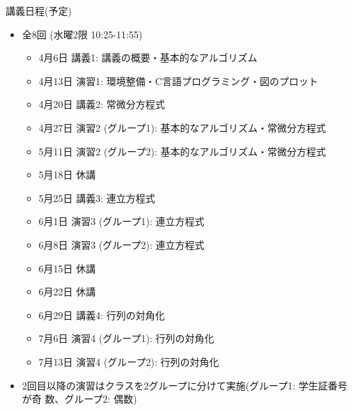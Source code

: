 \documentclass[10pt,dvipdfmx]{beamer}
\begin{document}
\begin{frame}[t]{講義日程(予定)}
  \begin{itemize}
  \item 全8回 (水曜2限 10:25-11:55)
    \begin{itemize}
    \item 4月6日 講義1: 講義の概要・基本的なアルゴリズム
    \item 4月13日 演習1: 環境整備・C言語プログラミング・図のプロット
    \item 4月20日 講義2: 常微分方程式
    \item {\color{red} 4月27日 演習2 (グループ1):} 基本的なアルゴリズム・常微分方程式
    \item {\color{red} 5月11日 演習2 (グループ2):} 基本的なアルゴリズム・常微分方程式
    \item {\color{gray} 5月18日 休講}
    \item 5月25日 講義3: 連立方程式
    \item 6月1日 演習3 (グループ1): 連立方程式
    \item 6月8日 演習3 (グループ2): 連立方程式
    \item {\color{gray} 6月15日 休講}
    \item {\color{gray} 6月22日 休講}
    \item 6月29日 講義4: 行列の対角化
    \item 7月6日 演習4 (グループ1): 行列の対角化
    \item 7月13日 演習4 (グループ2): 行列の対角化
    \end{itemize}
  \item 2回目以降の演習はクラスを2グループに分けて実施(グループ1: 学生証番号が奇
数、グループ2: 偶数)
  \end{itemize}
\end{frame}
\end{document}
